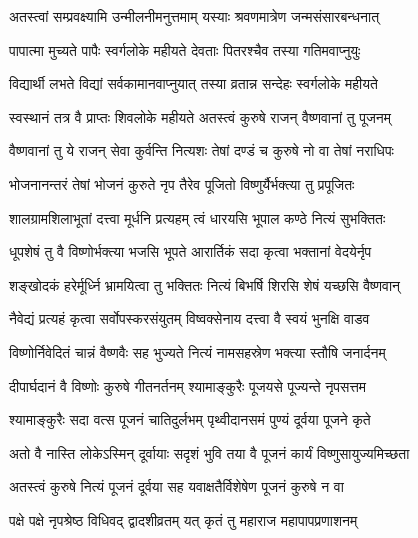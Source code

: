\label{sec:padma-unmilani}

\ganapatyadiDhyanam
\padmaPuranam



\twolineshloka
{अतस्त्वां सम्प्रवक्ष्यामि उन्मीलनीमनुत्तमाम्}
{यस्याः श्रवणमात्रेण जन्मसंसारबन्धनात्}%

\twolineshloka
{पापात्मा मुच्यते पापैः स्वर्गलोके महीयते}
{देवताः पितरश्चैव तस्या गतिमवाप्नुयुः}%

\twolineshloka
{विद्यार्थी लभते विद्यां सर्वकामानवाप्नुयात्}
{तस्या व्रतान्न सन्देहः स्वर्गलोके महीयते}%

\twolineshloka
{स्वस्थानं तत्र वै प्राप्तः शिवलोके महीयते}
{अतस्त्वं कुरुषे राजन् वैष्णवानां तु पूजनम्}%

\twolineshloka
{वैष्णवानां तु ये राजन् सेवा कुर्वन्ति नित्यशः}
{तेषां दण्डं च कुरुषे नो वा तेषां नराधिपः}%

\twolineshloka
{भोजनानन्तरं तेषां भोजनं कुरुते नृप}
{तैरेव पूजितो विष्णुर्यैर्भक्त्या तु प्रपूजितः}%

\twolineshloka
{शालग्रामशिलाभूतां दत्त्वा मूर्धनि प्रत्यहम्}
{त्वं धारयसि भूपाल कण्ठे नित्यं सुभक्तितः}%

\twolineshloka
{धूपशेषं तु वै विष्णोर्भक्त्या भजसि भूपते}
{आरार्तिकं सदा कृत्वा भक्तानां वेदयेर्नृप}%

\twolineshloka
{शङ्खोदकं हरेर्मूर्ध्नि भ्रामयित्वा तु भक्तितः}
{नित्यं बिभर्षि शिरसि शेषं यच्छसि वैष्णवान्}%

\twolineshloka
{नैवेद्यं प्रत्यहं कृत्वा सर्वोपस्करसंयुतम्}
{विष्वक्सेनाय दत्त्वा वै स्वयं भुनक्षि वाडव}%

\twolineshloka
{विष्णोर्निवेदितं चान्नं वैष्णवैः सह भुज्यते}
{नित्यं नामसहस्रेण भक्त्या स्तौषि जनार्दनम्}%

\twolineshloka
{दीपार्घदानं वै विष्णोः कुरुषे गीतनर्तनम्}
{श्यामाङ्कुरैः पूजयसे पूज्यन्ते नृपसत्तम}%

\twolineshloka
{श्यामाङ्कुरैः सदा वत्स पूजनं चातिदुर्लभम्}
{पृथ्वीदानसमं पुण्यं दूर्वया पूजने कृते}%

\twolineshloka
{अतो वै नास्ति लोकेऽस्मिन् दूर्वायाः सदृशं भुवि}
{तया वै पूजनं कार्यं विष्णुसायुज्यमिच्छता}%

\twolineshloka
{अतस्त्वं कुरुषे नित्यं पूजनं दूर्वया सह}
{यवाक्षतैर्विशेषेण पूजनं कुरुषे न वा}%

\twolineshloka
{पक्षे पक्षे नृपश्रेष्ठ विधिवद् द्वादशीव्रतम्}
{यत् कृतं तु महाराज महापापप्रणाशनम्}%

